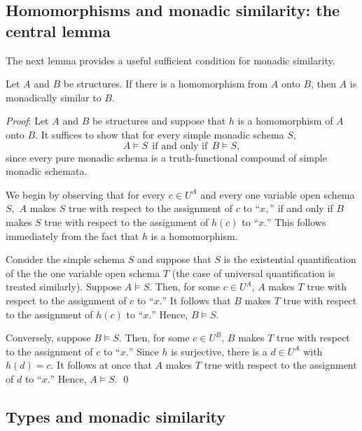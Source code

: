 \subsection{Homomorphisms and monadic similarity: the central lemma}

The next lemma provides a useful sufficient condition for monadic similarity.
\begin{lemma}\label{hom-lem}
Let $A$ and $B$ be structures. If there is a homomorphism from $A$
onto $B$, then $A$ is monadically similar to $B.$ 
\end{lemma}
\emph{Proof}:
Let $A$ and $B$ be structures and suppose that $h$ is a homomorphism of $A$
onto $B.$ It suffices to show that for every simple monadic schema $S,$
\[A\models S\ \ \mbox{if and only if}\ \ B\models S,\]
since every pure monadic schema is a truth-functional compound of simple
monadic schemata.

We begin by observing that for every $c \in U^A$ and every one variable open
schema $S,$ $A$ makes $S$ true with respect to the assignment of $c$ to
``$x,$''
 if and only if $B$ makes $S$ true with respect to the assignment of
$h(c)$ to ``$x.$'' This follows immediately from the fact that $h$ is a
homomorphism.

Consider the simple schema $S$ and suppose that $S$ is the existential
quantification of the the one variable open schema $T$ (the case of universal
quantification is treated similarly).
Suppose $A \models S.$ Then, for some $c \in U^A$,
$A$ makes $T$ true with respect to the assignment of $c$ to
``$x.$'' It follows that $B$ makes $T$ true with respect to the assignment of $h(c)$
to ``$x.$'' Hence, $B \models S.$

Conversely, suppose $B \models S.$
Then, for some $c \in U^B$,
$B$ makes $T$ true with respect to the assignment of $c$ to
``$x.$'' Since $h$ is surjective, there is a $d \in U^A$ with $h(d) = c.$
It follows at once that $A$ makes $T$ true with respect to the assignment of
$d$ to ``$x.$'' Hence, $A \models S.$ \qed
\subsection{Types and monadic similarity}

